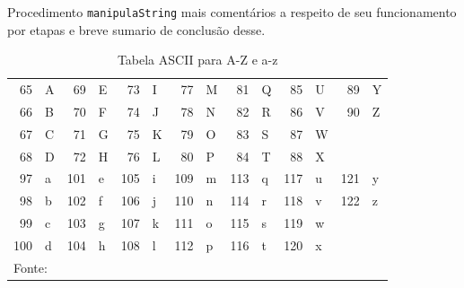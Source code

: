 \documentclass[12pt,a4paper]{article}
\numberwithin{figure}{subsection}
\numberwithin{table}{subsection}
\begin{document}
Procedimento \texttt{manipulaString} mais comentários a respeito de seu funcionamento por etapas e breve sumario de conclusão desse.

\lipsum[1]

\begin{table}[H]
	\renewcommand{\arraystretch}{1}
	\centering
	\caption{Tabela ASCII para A-Z e a-z}
	\label{tab:ascii}
	\begin{tabular}{rl|rl|rl|rl|rl|rl|rl}
		\toprule
		 65 & A &  69 & E &  73 & I &  77 & M &  81 & Q &  85 & U &  89 & Y \\
		 66 & B &  70 & F &  74 & J &  78 & N &  82 & R &  86 & V &  90 & Z \\
		 67 & C &  71 & G &  75 & K &  79 & O &  83 & S &  87 & W &     &   \\
		 68 & D &  72 & H &  76 & L &  80 & P &  84 & T &  88 & X &     &   \\
		\midrule
		 97 & a & 101 & e & 105 & i & 109 & m & 113 & q & 117 & u & 121 & y \\
		 98 & b & 102 & f & 106 & j & 110 & n & 114 & r & 118 & v & 122 & z \\
		 99 & c & 103 & g & 107 & k & 111 & o & 115 & s & 119 & w &     &   \\
		100 & d & 104 & h & 108 & l & 112 & p & 116 & t & 120 & x &     &   \\
		\bottomrule
		\multicolumn{12}{l}{\footnotesize Fonte: \citet*{wiki:xxx}}
	\end{tabular}
\end{table}
\end{document}
